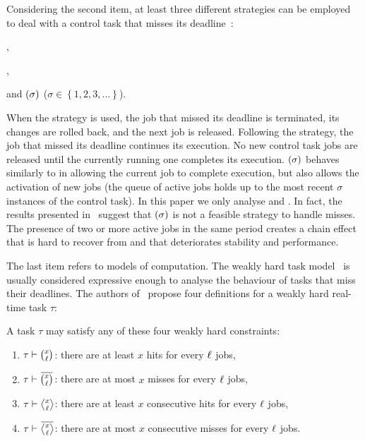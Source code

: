 Considering the second item, at least three different strategies can be employed to deal with a control task that misses its deadline~\cite{Cervin:2005}:
\begin{enumerate*}[label=(\roman*)]
    \item \emph{\tK{}},
    \item \emph{\tS{}},
    \item and \emph{\tQ{}$\left( \sigma \right)$} ($\sigma \in \left\{ 1, 2, 3, \ldots \right\}$).
\end{enumerate*}
%
When the \tK{} strategy is used, the job that missed its deadline is terminated, its changes are rolled back, and the next job is released.
Following the \tS{} strategy, the job that missed its deadline continues its execution.
No new control task jobs are released until the currently running one completes its execution.
\tQ{}$\left( \sigma \right)$ behaves similarly to \tS{} in allowing the current job to complete execution, but also allows the activation of new jobs (the queue of active jobs holds up to the most recent $\sigma$ instances of the control task).
In this paper we only analyse \tK{} and \tS{}.
In fact, the results presented in~\cite{Cervin:2005,Maggio:2020} suggest that \tQ{}$\left( \sigma \right)$ is not a feasible strategy to handle misses.
The presence of two or more active jobs in the same period creates a chain effect that is hard to recover from and that deteriorates stability and performance.

The last item refers to models of computation.
The weakly hard task model~\cite{Hamdaoui:1995, Bernat:2001} is usually considered expressive enough to analyse the behaviour of tasks that miss their deadlines.
The authors of~\cite{Bernat:2001} propose four definitions for a weakly hard real-time task $\tau$:
\begin{definition}%
    \label{def:wh-models}%
    A task $\tau$ may satisfy any of these four weakly hard constraints:
    \begin{enumerate}[label=(\roman*)]
        \item $\tau \vdash \binom{x}{\ell}$: there are at least $x$ hits for every $\ell$ jobs,
        \item $\tau \vdash \overbar{\binom{x}{\numtotalanalysed}}$: there are at most $x$ misses for every $\ell$ jobs, 
        \item $\tau \vdash \genfrac{<}{>}{0pt}{}{x}{\numtotalanalysed}$: there are at least $x$ consecutive hits for every $\ell$ jobs,
        \item $\tau \vdash \overbar{\genfrac{<}{>}{0pt}{}{x}{\numtotalanalysed}}$: there are at most $x$ consecutive misses for every $\ell$ jobs.
    \end{enumerate}
\end{definition}

